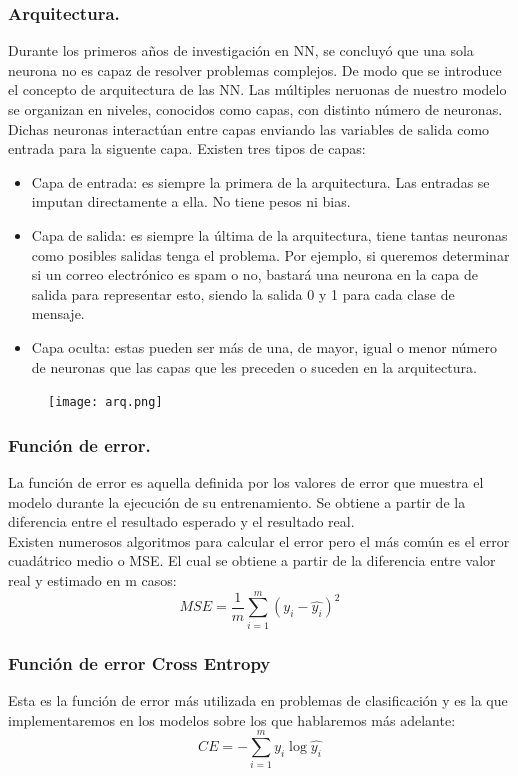 \documentclass[a4paper,10pt]{article}
\begin{document}
\subsubsection{Arquitectura.}
Durante los primeros años de investigación en NN, se concluyó que una sola neurona no es capaz de resolver problemas complejos. De modo que se introduce el concepto de arquitectura de las NN. Las múltiples neruonas de nuestro modelo se organizan en niveles, conocidos como capas, con distinto número de neuronas. Dichas neuronas interactúan entre capas enviando las variables de salida como entrada para la siguente capa.
Existen tres tipos de capas:
\begin{itemize}
    \item Capa de entrada: es siempre la primera de la arquitectura. Las entradas se imputan directamente a ella. No tiene pesos ni bias.
    \item Capa de salida: es siempre la última de la arquitectura, tiene tantas neuronas como posibles salidas tenga el problema. Por ejemplo, si queremos determinar si un correo electrónico es spam o no, bastará una neurona en la capa de salida para representar esto, siendo la salida 0 y 1 para cada clase de mensaje. 
    \item Capa oculta: estas pueden ser más de una, de mayor, igual o menor número de neuronas que las capas que les preceden o suceden en la arquitectura.
\end{itemize} 
\begin{figure}[H]
\centering
\texttt{[image: arq.png]}
\end{figure}
\subsubsection{Función de error.}
La función de error es aquella definida por los valores de error que muestra el modelo durante la ejecución de su entrenamiento. Se obtiene a partir de la diferencia entre el resultado esperado y el resultado real.\\ Existen numerosos algoritmos para calcular el error pero el más común es el error cuadátrico medio o MSE. El cual se obtiene a partir de la diferencia entre valor real y estimado en m casos:
\[
MSE=\frac{1}{m}\sum_{i=1}^m (y_i - \hat{y_i})^2
\]
\subsubsection{Función de error Cross Entropy}
Esta es la función de error más utilizada en problemas de clasificación y es la que implementaremos en los modelos sobre los que hablaremos más adelante: 
\[
CE=-\sum_{i=1}^m y_i \log\hat{y_i}
\]
\end{document}
